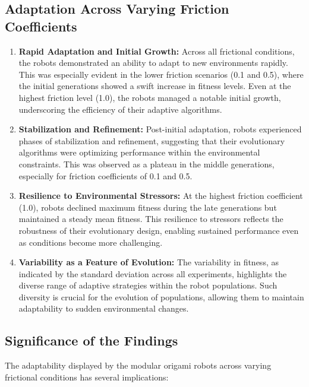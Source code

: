 \documentclass{sigchi}
\begin{document}
\subsection{Adaptation Across Varying Friction Coefficients}

\begin{enumerate}
    \item \textbf{Rapid Adaptation and Initial Growth:} Across all frictional conditions, the robots demonstrated an ability to adapt to new environments rapidly. This was especially evident in the lower friction scenarios (0.1 and 0.5), where the initial generations showed a swift increase in fitness levels. Even at the highest friction level (1.0), the robots managed a notable initial growth, underscoring the efficiency of their adaptive algorithms.
    
    \item \textbf{Stabilization and Refinement:} Post-initial adaptation, robots experienced phases of stabilization and refinement, suggesting that their evolutionary algorithms were optimizing performance within the environmental constraints. This was observed as a plateau in the middle generations, especially for friction coefficients of 0.1 and 0.5.
    
    \item \textbf{Resilience to Environmental Stressors:} At the highest friction coefficient (1.0), robots declined maximum fitness during the late generations but maintained a steady mean fitness. This resilience to stressors reflects the robustness of their evolutionary design, enabling sustained performance even as conditions become more challenging.
    
    \item \textbf{Variability as a Feature of Evolution:} The variability in fitness, as indicated by the standard deviation across all experiments, highlights the diverse range of adaptive strategies within the robot populations. Such diversity is crucial for the evolution of populations, allowing them to maintain adaptability to sudden environmental changes.
\end{enumerate}

\subsection{Significance of the Findings}

The adaptability displayed by the modular origami robots across varying frictional conditions has several implications:
\end{document}

